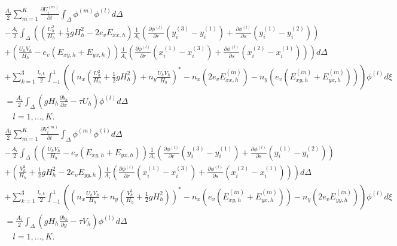 \documentclass[11pt]{article}
\begin{document}
{\footnotesize
\begin{multline}
\frac{A_i}{2}\displaystyle\sum_{m=1}^K\frac{\partial U_i^{(m)}}{\partial t}\int_{\Delta}\phi^{(m)}\phi^{(l)} d\Delta \\ - \frac{A_i}{2}\int_{\Delta}\left(\left(\frac{U_h^2}{H_h} + \frac{1}{2}gH_h^2 - 2e_vE_{xx,h}\right) \frac{1}{A_i}\left(\frac{\partial \phi^{(l)}}{\partial r}\left(y_i^{(3)}-y_i^{(1)}\right) + \frac{\partial \phi^{(l)}}{\partial s}\left(y_i^{(1)}-y_i^{(2)}\right) \right) \right. \\  \left. + \left(\frac{U_hV_h}{H_h} - e_v\left(E_{xy,h} + E_{yx,h}\right) \right) \frac{1}{A_i}\left(\frac{\partial \phi^{(l)}}{\partial r}\left(x_i^{(1)}-x_i^{(3)}\right) + \frac{\partial \phi^{(l)}}{\partial s}\left(x_i^{(2)}-x_i^{(1)}\right) \right) \right)d\Delta \\ + \displaystyle\sum_{k=1}^3 \frac{l_{i,k}}{2}\int_{-1}^1 \left( \left(n_x\left(\frac{U_h^2}{H_h} + \frac{1}{2}gH_h^2 \right)+ n_y\frac{U_hV_h}{H_h}\right)^*-n_x\left(2e_vE_{xx,h}^{(in)}\right) -n_y\left(e_v\left( E_{xy,h}^{(in)} + E_{yx,h}^{(in)}\right) \right) \right)\phi^{(l)} d\xi  \\ = \frac{A_i}{2}\int_{\Delta}\left(gH_h\frac{\partial b_h}{\partial x} - \tau U_h \right)\phi^{(l)} d\Delta \\ \quad l = 1,\ldots,K. 
\end{multline}}
{\footnotesize
\begin{multline}
\frac{A_i}{2}\displaystyle\sum_{m=1}^K\frac{\partial V_i^{(m)}}{\partial t}\int_{\Delta}\phi^{(m)}\phi^{(l)} d\Delta \\ - \frac{A_i}{2}\int_{\Delta}\left(\left(\frac{U_hV_h}{H_h}-e_v\left(E_{xy,h} + E_{yx,h} \right)\right) \frac{1}{A_i}\left(\frac{\partial \phi^{(l)}}{\partial r}\left(y_i^{(3)}-y_i^{(1)}\right) + \frac{\partial \phi^{(l)}}{\partial s}\left(y_i^{(1)}-y_i^{(2)}\right) \right)  \right. \\ + \left. \left(\frac{V_h^2}{H_h} + \frac{1}{2}gH_h^2 - 2e_vE_{yy,h} \right)  \frac{1}{A_i}\left(\frac{\partial \phi^{(l)}}{\partial r}\left(x_i^{(1)}-x_i^{(3)}\right) + \frac{\partial \phi^{(l)}}{\partial s}\left(x_i^{(2)}-x_i^{(1)}\right) \right) \right)d\Delta \\ + \displaystyle\sum_{k=1}^3 \frac{l_{i,k}}{2}\int_{-1}^1 \left( \left(n_x\frac{U_hV_h}{H_h} + n_y\left(\frac{V_h^2}{H_h}+\frac{1}{2}gH_h^2 \right)\right)^*-n_x\left(e_v\left(E_{xy,h}^{(in)} + E_{yx,h}^{(in)} \right) \right) -n_y \left(2e_vE_{yy,h}^{(in)} \right)\right)\phi^{(l)} d\xi  \\ = \frac{A_i}{2}\int_{\Delta}\left(gH_h\frac{\partial b_h}{\partial y} - \tau V_h \right)\phi^{(l)} d\Delta \\ \quad l = 1,\ldots,K. 
\end{multline}}
\end{document}
